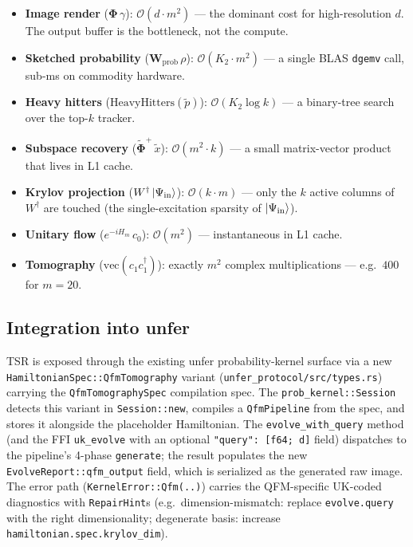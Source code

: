 \documentclass[11pt, a4paper]{article}
\begin{document}
\begin{itemize}
\item \textbf{Image render} ($\mathbf\Phi\,\gamma$): $\mathcal{O}(d\cdot m^2)$ ---
  the dominant cost for high-resolution $d$. The output buffer is the
  bottleneck, not the compute.
\item \textbf{Sketched probability} ($\mathbf{W}_{\mathrm{prob}}\,\rho$):
  $\mathcal{O}(K_2\cdot m^2)$ --- a single BLAS \texttt{dgemv} call, sub-ms
  on commodity hardware.
\item \textbf{Heavy hitters} ($\mathrm{HeavyHitters}(\tilde p)$):
  $\mathcal{O}(K_2\log k)$ --- a binary-tree search over the top-$k$ tracker.
\item \textbf{Subspace recovery} ($\tilde{\mathbf\Phi}^+\,\tilde x$):
  $\mathcal{O}(m^2\cdot k)$ --- a small matrix-vector product that lives in
  L1 cache.
\item \textbf{Krylov projection} ($W^\dagger\ket{\Psi_{\mathrm{in}}}$):
  $\mathcal{O}(k\cdot m)$ --- only the $k$ active columns of $W^\dagger$ are
  touched (the single-excitation sparsity of $\ket{\Psi_{\mathrm{in}}}$).
\item \textbf{Unitary flow} ($e^{-iH_m}\,c_0$): $\mathcal{O}(m^2)$ ---
  instantaneous in L1 cache.
\item \textbf{Tomography} ($\mathrm{vec}(c_1c_1^\dagger)$): exactly $m^2$
  complex multiplications --- e.g.\ $400$ for $m=20$.
\end{itemize}

\subsection{Integration into unfer}

TSR is exposed through the existing unfer probability-kernel surface via a
new \texttt{HamiltonianSpec::QfmTomography} variant
(\texttt{unfer\_protocol/src/types.rs}) carrying the
\texttt{QfmTomographySpec} compilation spec. The
\texttt{prob\_kernel::Session} detects this variant in
\texttt{Session::new}, compiles a \texttt{QfmPipeline} from the spec, and
stores it alongside the placeholder Hamiltonian. The \texttt{evolve\_with\_query}
method (and the FFI \texttt{uk\_evolve} with an optional
\texttt{"query": [f64; d]} field) dispatches to the pipeline's 4-phase
\texttt{generate}; the result populates the new
\texttt{EvolveReport::qfm\_output} field, which is serialized as the
generated raw image. The error path (\texttt{KernelError::Qfm(..)}) carries
the QFM-specific UK-coded diagnostics with \texttt{RepairHint}s (e.g.\
dimension-mismatch: replace \texttt{evolve.query} with the right
dimensionality; degenerate basis: increase \texttt{hamiltonian.spec.krylov\_dim}).
\end{document}
